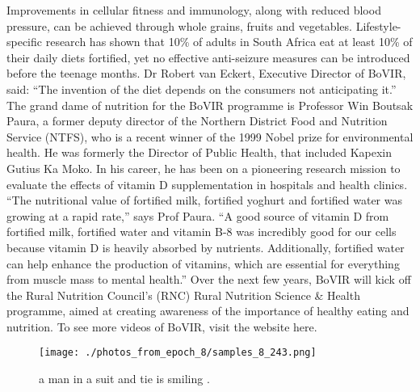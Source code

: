 \documentclass{article}%
\begin{document}
Improvements in cellular fitness and immunology, along with reduced blood pressure, can be achieved through whole grains, fruits and vegetables. Lifestyle{-}specific research has shown that 10\% of adults in South Africa eat at least 10\% of their daily diets fortified, yet no effective anti{-}seizure measures can be introduced before the teenage months. Dr Robert van Eckert, Executive Director of BoVIR, said: “The invention of the diet depends on the consumers not anticipating it.”\newline%
The grand dame of nutrition for the BoVIR programme is Professor Win Boutsak Paura, a former deputy director of the Northern District Food and Nutrition Service (NTFS), who is a recent winner of the 1999 Nobel prize for environmental health. He was formerly the Director of Public Health, that included Kapexin Gutius Ka Moko. In his career, he has been on a pioneering research mission to evaluate the effects of vitamin D supplementation in hospitals and health clinics. “The nutritional value of fortified milk, fortified yoghurt and fortified water was growing at a rapid rate,” says Prof Paura. “A good source of vitamin D from fortified milk, fortified water and vitamin B{-}8 was incredibly good for our cells because vitamin D is heavily absorbed by nutrients. Additionally, fortified water can help enhance the production of vitamins, which are essential for everything from muscle mass to mental health.”\newline%
Over the next few years, BoVIR will kick off the Rural Nutrition Council’s (RNC) Rural Nutrition Science \& Health programme, aimed at creating awareness of the importance of healthy eating and nutrition.\newline%
To see more videos of BoVIR, visit the website here.\newline%

%


\begin{figure}[h!]%
\centering%
\texttt{[image: ./photos\_from\_epoch\_8/samples\_8\_243.png]}%
\caption{a man in a suit and tie is smiling .}%
\end{figure}

%
\end{document}
